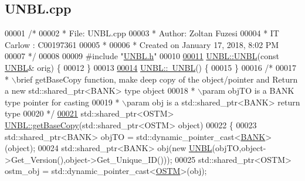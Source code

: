 \hypertarget{_u_n_b_l_8cpp_source}{}\subsection{U\+N\+B\+L.\+cpp}

\begin{DoxyCode}
00001 \textcolor{comment}{/* }
00002 \textcolor{comment}{ * File:   UNBL.cpp}
00003 \textcolor{comment}{ * Author: Zoltan Fuzesi}
00004 \textcolor{comment}{ * IT Carlow : C00197361}
00005 \textcolor{comment}{ *}
00006 \textcolor{comment}{ * Created on January 17, 2018, 8:02 PM}
00007 \textcolor{comment}{ */}
00008 
00009 \textcolor{preprocessor}{#include "\hyperlink{_u_n_b_l_8h}{UNBL.h}"}
00010 
\hypertarget{_u_n_b_l_8cpp_source.tex_l00011}{}\hyperlink{class_u_n_b_l_aca7a99d7308d5d8dd5841a0eeeed0852_aca7a99d7308d5d8dd5841a0eeeed0852}{00011} \hyperlink{class_u_n_b_l_aa264ef64c453e6049b3d4c984d84d1de_aa264ef64c453e6049b3d4c984d84d1de}{UNBL::UNBL}(\textcolor{keyword}{const} \hyperlink{class_u_n_b_l}{UNBL}& orig) \{
00012 \}
00013 
\hypertarget{_u_n_b_l_8cpp_source.tex_l00014}{}\hyperlink{class_u_n_b_l_a32d405e6e9adfab1ffdeec6406f9e72f_a32d405e6e9adfab1ffdeec6406f9e72f}{00014} \hyperlink{class_u_n_b_l_a32d405e6e9adfab1ffdeec6406f9e72f_a32d405e6e9adfab1ffdeec6406f9e72f}{UNBL::~UNBL}() \{
00015 \}
00016 \textcolor{comment}{/*}
00017 \textcolor{comment}{ * \(\backslash\)brief getBaseCopy function, make deep copy of the object/pointer and Return a new std::shared\_ptr<BANK>
       type object}
00018 \textcolor{comment}{ * \(\backslash\)param objTO is a BANK type pointer for casting}
00019 \textcolor{comment}{ * \(\backslash\)param obj is a std::shared\_ptr<BANK> return type}
00020 \textcolor{comment}{ */}
\hypertarget{_u_n_b_l_8cpp_source.tex_l00021}{}\hyperlink{class_u_n_b_l_a5dfe7f9e5fbb66abff9a73e40e803887_a5dfe7f9e5fbb66abff9a73e40e803887}{00021} std::shared\_ptr<OSTM> \hyperlink{class_u_n_b_l_a5dfe7f9e5fbb66abff9a73e40e803887_a5dfe7f9e5fbb66abff9a73e40e803887}{UNBL::getBaseCopy}(std::shared\_ptr<OSTM> \textcolor{keywordtype}{object})
00022 \{
00023     std::shared\_ptr<BANK> objTO = std::dynamic\_pointer\_cast<\hyperlink{class_b_a_n_k}{BANK}>(object);
00024     std::shared\_ptr<BANK> obj(\textcolor{keyword}{new} \hyperlink{class_u_n_b_l_aa264ef64c453e6049b3d4c984d84d1de_aa264ef64c453e6049b3d4c984d84d1de}{UNBL}(objTO,object->Get\_Version(),\textcolor{keywordtype}{object}->Get\_Unique\_ID())); 
00025     std::shared\_ptr<OSTM> ostm\_obj = std::dynamic\_pointer\_cast<\hyperlink{class_o_s_t_m}{OSTM}>(obj);                             
           

\end{DoxyCode}
